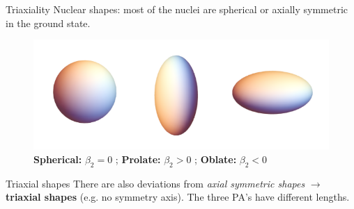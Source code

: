 \documentclass{beamer}
\begin{document}
\begin{frame}{Triaxiality}
Nuclear shapes: most of the nuclei are spherical or axially symmetric in the ground state.
  \begin{figure}
    \centering
    \includegraphics[scale=0.4]{figs/nuclear_shapes.png}
    \caption{\textbf{Spherical:} $\beta_2=0$ ; \textbf{Prolate:} $\beta_2>0$ ; \textbf{Oblate:} $\beta_2<0$}
  \end{figure}
  \begin{block}{Triaxial shapes}
       There are also deviations from \emph{axial symmetric shapes} $\to$ \textbf{triaxial shapes} (e.g. no symmetry axis). The three PA's have different lengths.
  \end{block}
\end{frame}
\end{document}
